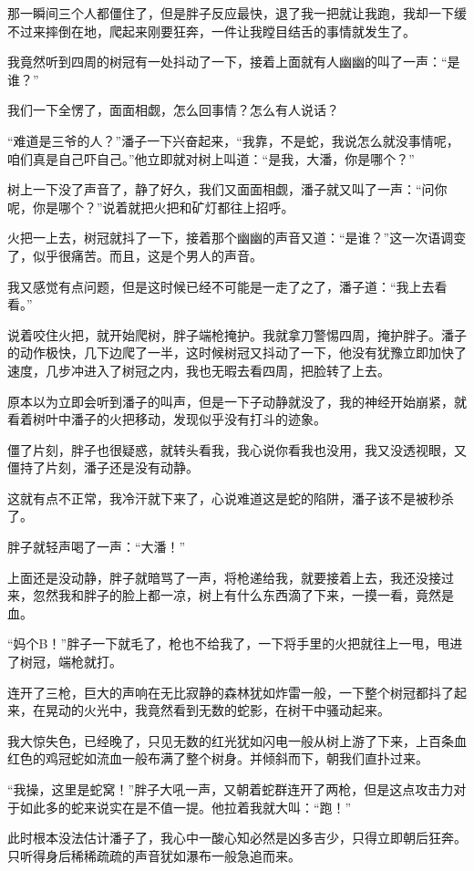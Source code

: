 那一瞬间三个人都僵住了，但是胖子反应最快，退了我一把就让我跑，我却一下缓不过来摔倒在地，爬起来刚要狂奔，一件让我瞠目结舌的事情就发生了。

我竟然听到四周的树冠有一处抖动了一下，接着上面就有人幽幽的叫了一声：“是谁？”

我们一下全愣了，面面相觑，怎么回事情？怎么有人说话？

“难道是三爷的人？”潘子一下兴奋起来，“我靠，不是蛇，我说怎么就没事情呢，咱们真是自己吓自己。”他立即就对树上叫道：“是我，大潘，你是哪个？”

树上一下没了声音了，静了好久，我们又面面相觑，潘子就又叫了一声：“问你呢，你是哪个？”说着就把火把和矿灯都往上招呼。

火把一上去，树冠就抖了一下，接着那个幽幽的声音又道：“是谁？”这一次语调变了，似乎很痛苦。而且，这是个男人的声音。

我又感觉有点问题，但是这时候已经不可能是一走了之了，潘子道：“我上去看看。”

说着咬住火把，就开始爬树，胖子端枪掩护。我就拿刀警惕四周，掩护胖子。潘子的动作极快，几下边爬了一半，这时候树冠又抖动了一下，他没有犹豫立即加快了速度，几步冲进入了树冠之内，我也无暇去看四周，把脸转了上去。

原本以为立即会听到潘子的叫声，但是一下子动静就没了，我的神经开始崩紧，就看着树叶中潘子的火把移动，发现似乎没有打斗的迹象。

僵了片刻，胖子也很疑惑，就转头看我，我心说你看我也没用，我又没透视眼，又僵持了片刻，潘子还是没有动静。

这就有点不正常，我冷汗就下来了，心说难道这是蛇的陷阱，潘子该不是被秒杀了。

胖子就轻声喝了一声：“大潘！”

上面还是没动静，胖子就暗骂了一声，将枪递给我，就要接着上去，我还没接过来，忽然我和胖子的脸上都一凉，树上有什么东西滴了下来，一摸一看，竟然是血。

“妈个B！”胖子一下就毛了，枪也不给我了，一下将手里的火把就往上一甩，甩进了树冠，端枪就打。

连开了三枪，巨大的声响在无比寂静的森林犹如炸雷一般，一下整个树冠都抖了起来，在晃动的火光中，我竟然看到无数的蛇影，在树干中骚动起来。

我大惊失色，已经晚了，只见无数的红光犹如闪电一般从树上游了下来，上百条血红色的鸡冠蛇如流血一般布满了整个树身。并倾斜而下，朝我们直扑过来。

“我操，这里是蛇窝！”胖子大吼一声，又朝着蛇群连开了两枪，但是这点攻击力对于如此多的蛇来说实在是不值一提。他拉着我就大叫：“跑！”

此时根本没法估计潘子了，我心中一酸心知必然是凶多吉少，只得立即朝后狂奔。只听得身后稀稀疏疏的声音犹如瀑布一般急追而来。


